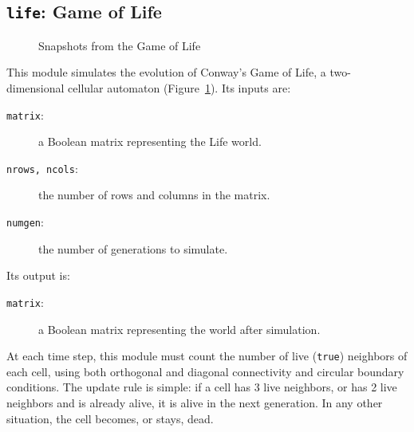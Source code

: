 \subsection{{\tt{life}}:
	Game of Life
	\label{s:toys-life}}

\begin{figure}
\begin{center}
\end{center}
\caption{Snapshots from the Game of Life\label{f:life}}
\end{figure}

This module simulates the evolution of Conway's Game of Life,
a two-dimensional cellular automaton (Figure~\ref{f:life}).
Its inputs are:
\begin{description}
\item[{\tt{matrix}}:]
	a Boolean matrix representing the Life world.
\item[{\tt{nrows, ncols}}:]
	the number of rows and columns in the matrix.
\item[{\tt{numgen}}:]
	the number of generations to simulate.
\end{description}
Its output is:
\begin{description}
\item[{\tt{matrix}}:]
	a Boolean matrix representing the world after simulation.
\end{description}
At each time step,
this module must count the number of live ({\tt{true}}) neighbors
of each cell,
using both orthogonal and diagonal connectivity
and circular boundary conditions.
The update rule is simple:
if a cell has 3 live neighbors,
or has 2 live neighbors and is already alive,
it is alive in the next generation.
In any other situation,
the cell becomes, or stays, dead.
